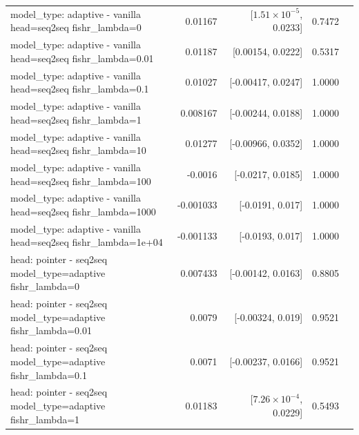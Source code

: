 \documentclass[10pt]{article}
\makeatletter
\newcommand{\stackcell}[1]{\begin{tabular}[t]{@{}l@{}}#1\end{tabular}}
\makeatother
\begin{document}
{\begin{longtable}{lrrrl}
\stackcell{model\_type: adaptive - vanilla\\\footnotesize head=seq2seq fishr\_lambda=0 } & 0.01167 & [$1.51\times10^{-5}$, 0.0233] & 0.7472 & \\
\stackcell{model\_type: adaptive - vanilla\\\footnotesize head=seq2seq fishr\_lambda=0.01 } & 0.01187 & [0.00154, 0.0222] & 0.5317 & \\
\stackcell{model\_type: adaptive - vanilla\\\footnotesize head=seq2seq fishr\_lambda=0.1 } & 0.01027 & [-0.00417, 0.0247] & 1.0000 & \\
\stackcell{model\_type: adaptive - vanilla\\\footnotesize head=seq2seq fishr\_lambda=1 } & 0.008167 & [-0.00244, 0.0188] & 1.0000 & \\
\stackcell{model\_type: adaptive - vanilla\\\footnotesize head=seq2seq fishr\_lambda=10 } & 0.01277 & [-0.00966, 0.0352] & 1.0000 & \\
\stackcell{model\_type: adaptive - vanilla\\\footnotesize head=seq2seq fishr\_lambda=100 } & -0.0016 & [-0.0217, 0.0185] & 1.0000 & \\
\stackcell{model\_type: adaptive - vanilla\\\footnotesize head=seq2seq fishr\_lambda=1000 } & -0.001033 & [-0.0191, 0.017] & 1.0000 & \\
\stackcell{model\_type: adaptive - vanilla\\\footnotesize head=seq2seq fishr\_lambda=1e+04 } & -0.001133 & [-0.0193, 0.017] & 1.0000 & \\
\stackcell{head: pointer - seq2seq\\\footnotesize model\_type=adaptive fishr\_lambda=0 } & 0.007433 & [-0.00142, 0.0163] & 0.8805 & \\
\stackcell{head: pointer - seq2seq\\\footnotesize model\_type=adaptive fishr\_lambda=0.01 } & 0.0079 & [-0.00324, 0.019] & 0.9521 & \\
\stackcell{head: pointer - seq2seq\\\footnotesize model\_type=adaptive fishr\_lambda=0.1 } & 0.0071 & [-0.00237, 0.0166] & 0.9521 & \\
\stackcell{head: pointer - seq2seq\\\footnotesize model\_type=adaptive fishr\_lambda=1 } & 0.01183 & [$7.26\times10^{-4}$, 0.0229] & 0.5493 & \\

\end{longtable}}
\end{document}
